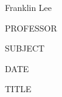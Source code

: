 \documentclass[12pt]{article}
\begin{document}
Franklin Lee

PROFESSOR                       %

SUBJECT                         %

DATE                            %

{\centering TITLE\par}          %

\parindent=0.5in

\end{document}
